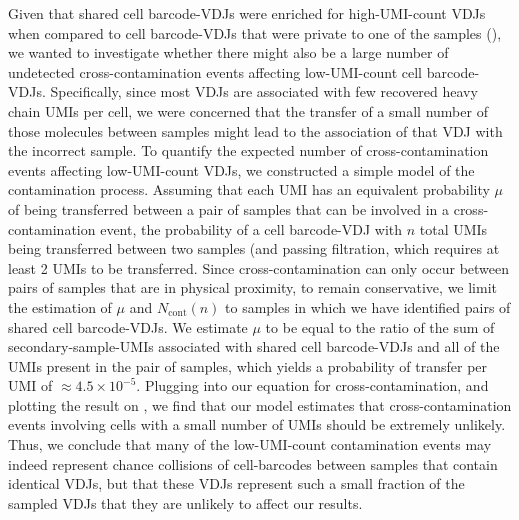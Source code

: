 Given that shared cell barcode-VDJs were enriched for high-UMI-count VDJs when compared to cell barcode-VDJs that were private to one of the samples (), we wanted to investigate whether there might also be a large number of undetected cross-contamination events affecting low-UMI-count cell barcode-VDJs. Specifically, since most VDJs are associated with few recovered heavy chain UMIs per cell, we were concerned that the transfer of a small number of those molecules between samples might lead to the association of that VDJ with the incorrect sample. To quantify the expected number of cross-contamination events affecting low-UMI-count VDJs, we constructed a simple model of the contamination process. Assuming that each UMI has an equivalent probability $\mu$ of being transferred between a pair of samples that can be involved in a cross-contamination event, the probability of a cell barcode-VDJ with $n$ total UMIs being transferred between two samples (and passing filtration, which requires at least 2 UMIs to be transferred.
Since cross-contamination can only occur between pairs of samples that are in physical proximity, to remain conservative, we limit the estimation of $\mu$ and $N_\mathrm{cont}(n)$ to samples in which we have identified pairs of shared cell barcode-VDJs. We estimate $\mu$ to be equal to the ratio of the sum of secondary-sample-UMIs associated with shared cell barcode-VDJs and all of the UMIs present in the pair of samples, which yields a probability of transfer per UMI of $\approx 4.5 \times 10^{-5}$. Plugging into our equation for cross-contamination, and plotting the result on , we find that our model estimates that cross-contamination events involving cells with a small number of UMIs should be extremely unlikely. Thus, we conclude that many of the low-UMI-count contamination events may indeed represent chance collisions of cell-barcodes between samples that contain identical VDJs, but that these VDJs represent such a small fraction of the sampled VDJs that they are unlikely to affect our results.

